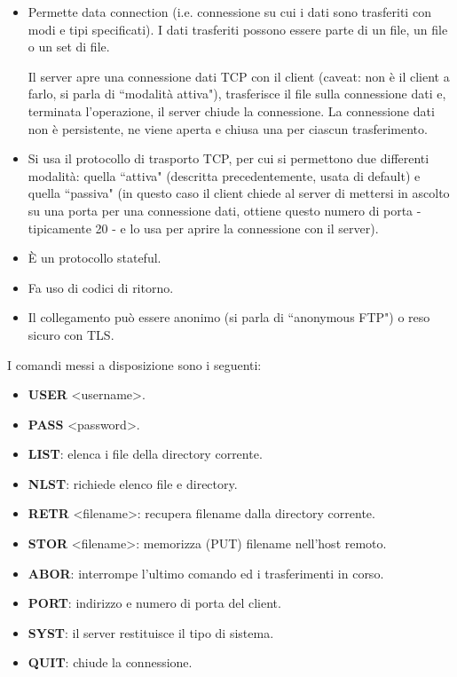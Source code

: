\documentclass[11pt, italian, openany]{book}
\begin{document}
\begin{sloppypar}
\begin{itemize}[topsep=0pt]
\begin{itemize}
		Il client FTP contatta il server FTP alla porta 21, ottiene l’autorizzazione sulla connessione di controllo e invia i comandi su di questa
		(e.g. cambio directory, invio file, ecc.). La connessione di controllo \`e persistente
		\item Permette data connection (i.e. connessione su cui i dati sono trasferiti con modi e tipi specificati). I dati trasferiti possono essere
		parte di un file, un file o un set di file.

		Il server apre una connessione dati TCP con il client (caveat: non \`e il client a farlo, si parla di ``modalit\`a attiva"), trasferisce il
		file sulla connessione dati e, terminata l'operazione, il server chiude la connessione. La connessione dati non \`e persistente, ne viene
		aperta e chiusa una per ciascun trasferimento.
		\item Si usa il protocollo di trasporto TCP, per cui si permettono due differenti modalit\`a: quella ``attiva" (descritta precedentemente,
		usata di default) e quella ``passiva" (in questo caso il client chiede al server di mettersi in ascolto su una porta per una connessione dati,
		ottiene questo numero di porta - tipicamente 20 - e lo usa per aprire la connessione con il server).
		\item \`E un protocollo stateful.
		\item Fa uso di codici di ritorno.
		\item Il collegamento pu\`o essere anonimo (si parla di ``anonymous FTP") o reso sicuro con TLS.
	\end{itemize}
	I comandi messi a disposizione sono i seguenti:
	\vspace{-3.5mm}
	\begin{itemize}
		\itemsep -0.3em
		\item \textbf{USER} \textless{username}\textgreater{.}
		\item \textbf{PASS} \textless{password}\textgreater{.}
		\item \textbf{LIST}: elenca i file della directory corrente.
		\item \textbf{NLST}: richiede elenco file e directory.
		\item \textbf{RETR} \textless{filename}\textgreater{:} recupera filename dalla directory corrente.
		\item \textbf{STOR} \textless{filename}\textgreater{:} memorizza (PUT) filename nell'host remoto.
		\item \textbf{ABOR}: interrompe l’ultimo comando ed i trasferimenti in corso.
		\item \textbf{PORT}: indirizzo e numero di porta del client.
		\item \textbf{SYST}: il server restituisce il tipo di sistema.
		\item \textbf{QUIT}: chiude la connessione.
	\end{itemize}
\end{itemize}


\end{sloppypar}
\end{document}
